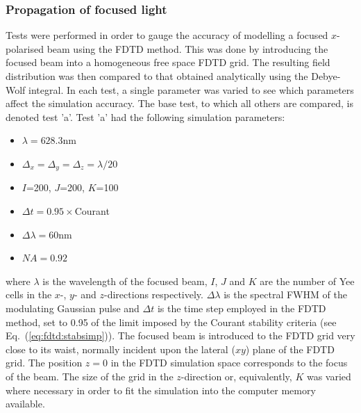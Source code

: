 \documentclass[a4paper, 12pt]{article}
\newcommand{\eq}[1]{Eq.\ (\ref{#1})}
\begin{document}
	\subsubsection{Propagation of focused light}
	\label{sec:fdtd:focuselight}
	Tests were performed in order to gauge the accuracy of modelling a
	focused $x$-polarised beam using the FDTD method. This was done by
	introducing the focused beam into a homogeneous free space FDTD grid. The
	resulting field distribution was then compared to that obtained
	analytically using the Debye-Wolf integral. In each test, a single parameter was
	varied to see which parameters affect the simulation accuracy. The
	base test, to which all others are compared, is denoted test 'a'. Test
	'a' had the following simulation parameters:
	\begin{itemize}
		\item $\lambda = 628.3$nm
		\item $\Delta_x=\Delta_y=\Delta_z=\lambda/20$
		\item $I$=200, $J$=200, $K$=100
		\item $\Delta t=0.95\times$Courant
		\item $\Delta\lambda=60$nm
		\item $NA=0.92$
	\end{itemize} 
	where $\lambda$ is the wavelength of the focused beam, $I$, $J$ and
	$K$ are the number of Yee cells in the $x$-, $y$- and $z$-directions
	respectively. $\Delta\lambda$ is the spectral FWHM of the modulating
	Gaussian pulse and $\Delta t$ is the time step employed in the FDTD
	method, set to 0.95 of the limit imposed by the Courant stability
	criteria (see \eq{eq:fdtd:stabsimp}). The focused beam is introduced
	to the FDTD grid very close to its waist, normally incident upon the
	lateral ($xy$) plane of the FDTD grid. The position $z=0$ in the FDTD
	simulation space corresponds to the focus of the beam. The size of the
	grid in the $z$-direction or, equivalently, $K$ was varied where
	necessary in order to fit the simulation into the computer memory
	available. 
	
\end{document}
